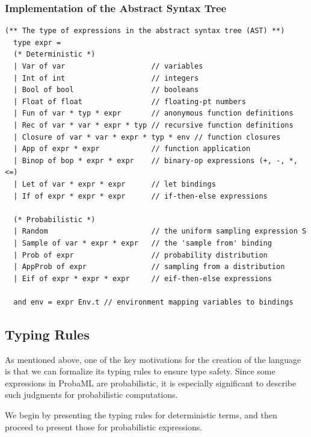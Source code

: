 \documentclass[pageno]{jpaper}
\begin{document}
\subsubsection{Implementation of the Abstract Syntax Tree}
\begin{Verbatim}[frame=single, baselinestretch=1, formatcom=\color{MidnightBlue}]
  (** The type of expressions in the abstract syntax tree (AST) **)
  type expr =
  (* Deterministic *)
  | Var of var                    // variables
  | Int of int                    // integers
  | Bool of bool                  // booleans
  | Float of float                // floating-pt numbers
  | Fun of var * typ * expr       // anonymous function definitions
  | Rec of var * var * expr * typ // recursive function definitions
  | Closure of var * var * expr * typ * env // function closures
  | App of expr * expr            // function application
  | Binop of bop * expr * expr    // binary-op expressions (+, -, *, <=)
  | Let of var * expr * expr      // let bindings
  | If of expr * expr * expr      // if-then-else expressions

  (* Probabilistic *)
  | Random                        // the uniform sampling expression S
  | Sample of var * expr * expr   // the 'sample from' binding
  | Prob of expr                  // probability distribution
  | AppProb of expr               // sampling from a distribution
  | Eif of expr * expr * expr     // eif-then-else expressions

  and env = expr Env.t // environment mapping variables to bindings
\end{Verbatim}

\subsection{Typing Rules}
As mentioned above, one of the key motivations for the creation of the language is that we can formalize its typing rules to ensure type safety. Since some expressions in ProbaML are probabilistic, it is especially significant to describe such judgments for probabilistic computations.

We begin by presenting the typing rules for deterministic terms, and then proceed to present those for probabilistic expressions.
\end{document}
